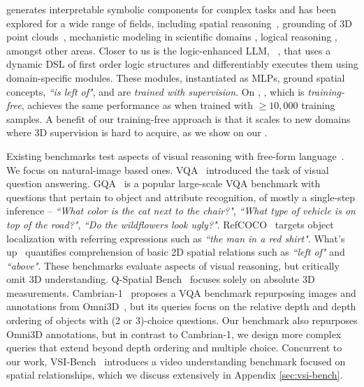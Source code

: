  generates interpretable symbolic components for complex tasks 
and has been explored for a wide range of fields, including spatial reasoning~\cite{mao2019neuro}, grounding of 3D point clouds~\cite{ns3d}, mechanistic modeling in scientific domains \cite{grayeli2024symbolic,sun2022neurosymbolic}, logical reasoning \cite{olausson2023linc}, amongst other areas. 
Closer to us is the logic-enhanced LLM, \leftm~\cite{whatsleft}, that uses a dynamic DSL of first order logic structures and differentiably executes them using domain-specific modules. These modules, instantiated as MLPs, ground spatial concepts, \eg \emph{``is left of"}, and are \emph{trained with supervision}.
On \clevr, \method, which is \emph{training-free}, achieves the same performance as \leftm when trained with $\geq 10,000$ training samples. 
A benefit of our training-free approach is that it scales to new domains where 3D supervision is hard to acquire, as we show on our \ourbench.

Existing benchmarks test aspects of visual reasoning with free-form language~\cite{laurent2024lab, arc}.
We focus on natural-image based ones. 
VQA~\cite{vqa} introduced the task of visual question answering.
GQA~\cite{gqa} is a popular large-scale VQA benchmark with questions that pertain to object and attribute recognition, of mostly a single-step inference -- \emph{``What color is the cat next to the chair?"}, \emph{``What type of vehicle is on top of the road?"}, \emph{``Do the wildflowers look ugly?"}. 
RefCOCO~\cite{refcoco} targets object localization with referring expressions such as \emph{``the man in a red shirt"}. 
What's up~\cite{whatsup} quantifies comprehension of basic 2D spatial relations such as \emph{``left of"} and \emph{``above"}.
These benchmarks evaluate aspects of visual reasoning, but critically omit 3D understanding. 
Q-Spatial Bench~\cite{qspatial} focuses solely on absolute 3D measurements.
Cambrian-1~\cite{cambrian1} proposes a VQA benchmark repurposing images and annotations from Omni3D~\cite{omni3d}, but its queries focus on the relative depth and depth ordering of objects with (2 or 3)-choice questions.
Our benchmark also repurposes Omni3D annotations, but in contrast to Cambrian-1, we design more complex queries that extend beyond depth ordering and multiple choice. Concurrent to our work, VSI-Bench~\cite{thinkinginspace} introduces a video understanding benchmark focused on spatial relationships, which we discuss extensively in Appendix \ref{sec:vsi-bench}.
